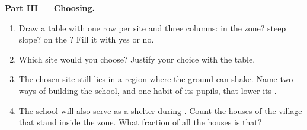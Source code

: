 \begin{problem}
\noindent\textbf{Part III --- Choosing.}\par\nopagebreak
\begin{enumerate}[resume, beginpenalty=10000]
  \item Draw a table with one row per site and three columns: in the
         zone? steep slope? on the ? Fill it with yes or no.
  \item Which site would you choose? Justify your choice with the table.
  \item The chosen site still lies in a region where the ground can
        shake. Name two ways of building the school, and one habit of its
        pupils, that lower its .
  \item The school will also serve as a shelter during . Count the
        houses of the village that stand inside the  zone. What
        fraction of all the houses is that?
\end{enumerate}
\end{problem}
